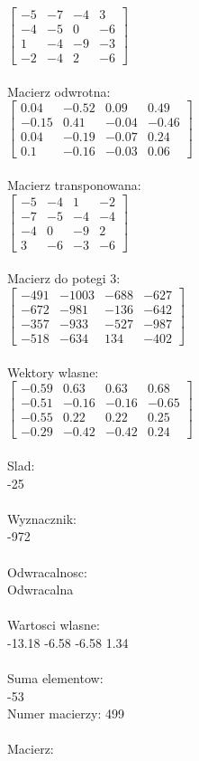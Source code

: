 \documentclass[a4paper,12pt]{article}
\begin{document}
$\begin{bmatrix} -5&-7&-4&3\\-4&-5&0&-6\\1&-4&-9&-3\\-2&-4&2&-6 \end{bmatrix}$
\\
\\
Macierz odwrotna:\\

$\begin{bmatrix} 0.04&-0.52&0.09&0.49\\-0.15&0.41&-0.04&-0.46\\0.04&-0.19&-0.07&0.24\\0.1&-0.16&-0.03&0.06 \end{bmatrix}$
\\
\\
Macierz transponowana:\\

$\begin{bmatrix} -5&-4&1&-2\\-7&-5&-4&-4\\-4&0&-9&2\\3&-6&-3&-6 \end{bmatrix}$
\\
\\
Macierz do potegi 3:\\

$\begin{bmatrix} -491&-1003&-688&-627\\-672&-981&-136&-642\\-357&-933&-527&-987\\-518&-634&134&-402 \end{bmatrix}$
\\
\\
Wektory wlasne:\\

$\begin{bmatrix} -0.59&0.63&0.63&0.68\\-0.51&-0.16&-0.16&-0.65\\-0.55&0.22&0.22&0.25\\-0.29&-0.42&-0.42&0.24 \end{bmatrix}$
\\
\\
Slad:\\
-25
\\
\\
Wyznacznik:\\
-972
\\
\\
Odwracalnosc:\\
Odwracalna
\\
\\
Wartosci wlasne:\\
-13.18 -6.58 -6.58 1.34
\\
\\
Suma elementow:\\
-53
\\
\newpage
Numer macierzy:
499
\\
\\
Macierz:\\
\end{document}
